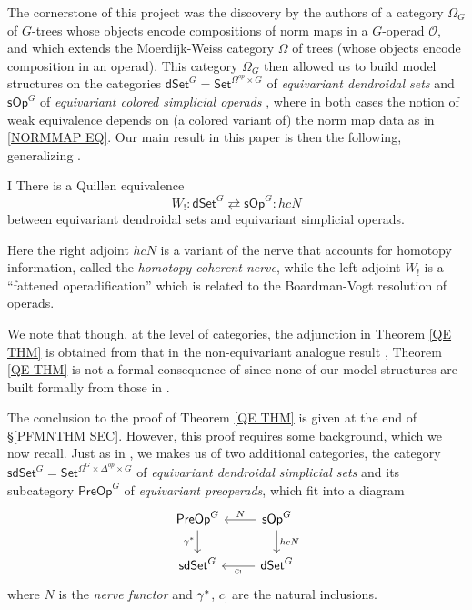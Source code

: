 \documentclass[a4paper,10pt
,draft
]{article}%
\numberwithin{equation}{section}
\numberwithin{figure}{section}
\theoremstyle{definition} %
\newcommand{\sOp}{\ensuremath{\mathsf{sOp}}}%
\newcommand{\dSet}{\mathsf{dSet}}
\renewcommand{\O}{\ensuremath{\mathcal O}}
\newcommand{\1}{\ensuremath{\mathbbm 1}}%
\begin{document}
The cornerstone of this project was the discovery by the authors of 
a category $\Omega_G$ of $G$-trees 
whose objects encode compositions of norm maps
in a $G$-operad $\O$,
and which extends the Moerdijk-Weiss category $\Omega$
of trees (whose objects encode composition in an operad).
This category $\Omega_G$
then allowed us to build model structures
on the categories
$\mathsf{dSet}^G = \mathsf{Set}^{\Omega^{op} \times G}$
of \emph{equivariant dendroidal sets}
\cite{Per18}
and 
$\mathsf{sOp}^G$
of 
\emph{equivariant colored simplicial operads}
\cite{BP_HGOP},
where in both cases the notion of weak equivalence
depends on (a colored variant of) the norm map data as in 
\eqref{NORMMAP EQ}.
Our main result in this paper is then the following,
generalizing \cite[Thm. 8.15]{CM13b}.
\begin{customthm}{I}\label{QE THM}
	There is a Quillen equivalence
	\begin{equation}
	\label{QE_EQ}
	W_! \colon \dSet^G \rightleftarrows \sOp^G \colon hcN
	\end{equation}
	between equivariant dendroidal sets and
	equivariant simplicial operads.
\end{customthm}
Here the right adjoint $hcN$
is a variant of the nerve that accounts for homotopy information,
called the \emph{homotopy coherent nerve},
while the left adjoint $W_!$
is a ``fattened operadification'' 
which is related to the Boardman-Vogt resolution of operads.

We note that though, at the level of categories,
the adjunction in Theorem \ref{QE THM}
is obtained from that in the non-equivariant analogue result
\cite[Thm. 8.15]{CM13b},
Theorem \ref{QE THM} is not a formal consequence of 
\cite[Thm. 8.15]{CM13b}
since none of our model structures 
are built formally from those in \cite[Thm. 8.15]{CM13b}.

The conclusion to the proof of Theorem \ref{QE THM}
is given at the end of 
\S \ref{PFMNTHM SEC}.
However, this proof requires some background, which we now recall.
Just as in \cite{CM13b},
we makes us of two additional categories,
the category 
$\mathsf{sdSet}^G
= \mathsf{Set}^{\Omega^G\times \Delta^{op} \times G}$
of \emph{equivariant dendroidal simplicial sets}
and its 
subcategory
$\mathsf{PreOp}^G$
of \emph{equivariant preoperads}, which fit into a diagram
\begin{equation}\label{ADJSQ EQ}
	\begin{tikzcd}
	\mathsf{PreOp}^G \ar{d}[swap]{\gamma^{\**}}&
	\mathsf{sOp}^G \ar{l}[swap]{N} \ar{d}{hcN}
\\
	\mathsf{sdSet}^G &
	\mathsf{dSet}^G \ar{l}{c_{!}}
	\end{tikzcd}
\end{equation}
where $N$ is the \emph{nerve functor}
and $\gamma^{\**}$, $c_!$ are the natural inclusions.
\end{document}
